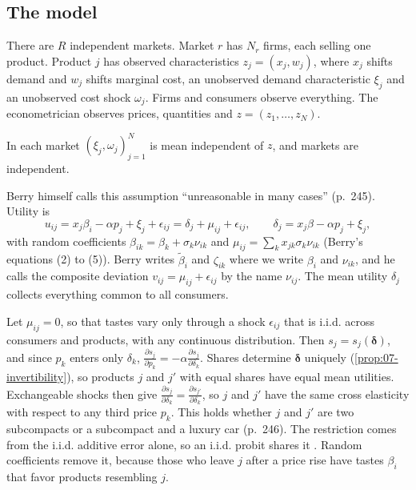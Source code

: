 \subsection{The model}\label{sec:07-berry-model}

There are $R$ independent markets. Market $r$ has $N_r$ firms, each selling one product. Product $j$ has observed
characteristics $z_j = (x_j, w_j)$, where $x_j$ shifts demand and $w_j$ shifts marginal cost, an unobserved
demand characteristic $\xi_j$ and an unobserved cost shock $\omega_j$. Firms and consumers observe everything.
The econometrician observes prices, quantities and $z = (z_1, \dots, z_N)$.

\begin{assumption}\label{asm:07-berry-exog}
In each market $(\xi_j, \omega_j)_{j=1}^N$ is mean independent of $z$, and markets are independent.
\end{assumption}

Berry himself calls this assumption ``unreasonable in many cases'' (p.~245). Utility is
\begin{equation}\label{eq:07-berry-utility}
u_{ij} = x_j\beta_i - \alpha p_j + \xi_j + \epsilon_{ij} = \delta_j + \mu_{ij} + \epsilon_{ij},
\qquad
\delta_j = x_j\beta - \alpha p_j + \xi_j ,
\end{equation}
with random coefficients $\beta_{ik} = \beta_k + \sigma_k\nu_{ik}$ and $\mu_{ij} = \sum_k x_{jk}\sigma_k\nu_{ik}$
(Berry's equations (2) to (5)). Berry writes $\tilde\beta_i$ and $\zeta_{ik}$ where we write $\beta_i$ and
$\nu_{ik}$, and he calls the composite deviation $v_{ij} = \mu_{ij} + \epsilon_{ij}$ by the name $\nu_{ij}$. The
mean utility $\delta_j$ collects everything common to all consumers.

\begin{remark}\label{rem:07-berry-iid}
Let $\mu_{ij} = 0$, so that tastes vary only through a shock $\epsilon_{ij}$ that is i.i.d. across consumers and
products, with any continuous distribution. Then $s_j = s_j(\boldsymbol\delta)$, and since $p_k$ enters only
$\delta_k$, $\frac{\partial s_j}{\partial p_k} = -\alpha\frac{\partial s_j}{\partial\delta_k}$. Shares determine
$\boldsymbol\delta$ uniquely (\cref{prop:07-invertibility}), so products $j$ and $j'$ with equal shares have equal
mean utilities. Exchangeable shocks then give $\frac{\partial s_j}{\partial\delta_k} = \frac{\partial
s_{j'}}{\partial\delta_k}$, so $j$ and $j'$ have the same cross elasticity with respect to any third price
$p_k$. This holds whether $j$ and $j'$ are two subcompacts or a subcompact and a luxury car (p.~246). The
restriction comes from the i.i.d. additive error alone, so an i.i.d. probit shares it \citep{HausmanWise1978}.
Random coefficients remove it, because those who leave $j$ after a price rise have tastes $\beta_i$ that favor
products resembling $j$.
\end{remark}

